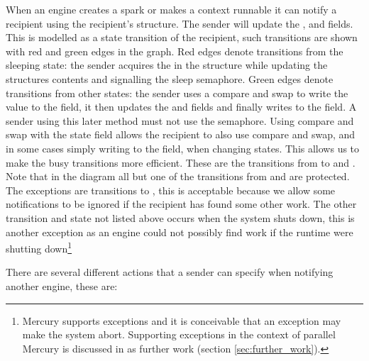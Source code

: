 When an engine creates a spark or makes a context runnable
it can notify a recipient using the recipient's
\enginesleepsync structure.
The sender will update the ,  and
 fields.
This is modelled as a state transition of the recipient,
such transitions are shown with red and green edges in the graph.
Red edges denote transitions from the sleeping state:
the sender acquires the  in the
\enginesleepsync structure while updating the structures contents and
signalling the sleep semaphore. 
Green edges denote transitions from other states:
the sender uses a compare and swap to write the  value to the
 field,
it then updates the  and  fields
and finally writes  to the  field.
A sender using this later method must not use the semaphore.
Using compare and swap with the state field allows the recipient to also
use compare and swap, and in some cases simply writing to the field,
when changing states.
This allows us to make the busy transitions more efficient.
These are the transitions from 
 to
 and 
.
Note that in the diagram all but one of the transitions from
 and 
are protected.
The exceptions are transitions to ,
this is acceptable because we allow some notifications to be ignored if the
recipient has found some other work.
The other transition and state not listed above occurs when the system shuts
down,
this is another exception as an engine could not possibly find work if the
runtime were shutting down\footnote{
    Mercury supports exceptions and it is conceivable that an exception may
    make the system abort.
    Supporting exceptions in the context of parallel Mercury is discussed in
    as further work (section \ref{sec:further_work}).
}

There are several different actions that a sender can specify when notifying
another engine,
these are:

